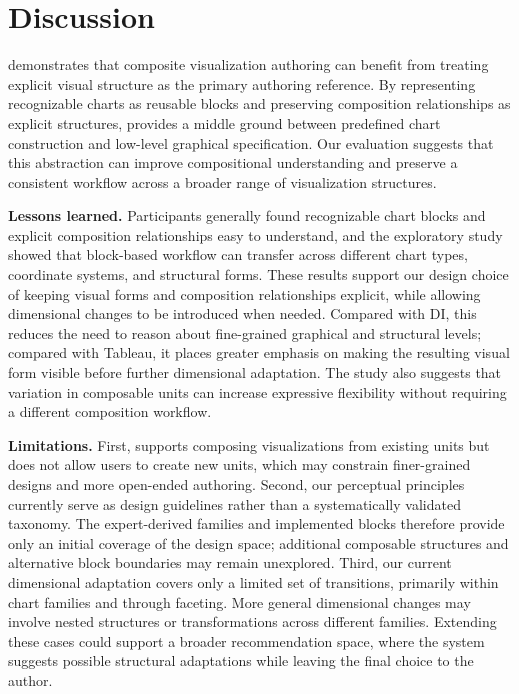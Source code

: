 \section{Discussion}
\label{sec:discussion}

{\system} demonstrates that composite visualization authoring can benefit from
treating explicit visual structure as the primary authoring reference. By
representing recognizable charts as reusable blocks and preserving composition
relationships as explicit structures, {\system} provides a middle ground
between predefined chart construction and low-level graphical specification.
Our evaluation suggests that this abstraction can improve compositional
understanding and preserve a consistent workflow across a broader range of
visualization structures.

\textbf{Lessons learned.}
Participants generally found recognizable chart blocks and explicit
composition relationships easy to understand, and the exploratory study showed
that block-based workflow can transfer across different chart
types, coordinate systems, and structural forms. These results support our
design choice of keeping visual forms and composition relationships explicit,
while allowing dimensional changes to be introduced when needed. Compared with
DI, this reduces the need to reason about fine-grained graphical and structural
levels; compared with Tableau, it places greater emphasis on making the
resulting visual form visible before further dimensional adaptation. The study
also suggests that variation in composable units can increase expressive
flexibility without requiring a different composition workflow.

\textbf{Limitations.} First, {\system} supports
composing visualizations from existing units but does not allow users to create
new units, which may constrain finer-grained designs and more open-ended
authoring. Second, our perceptual principles currently serve as design
guidelines rather than a systematically validated taxonomy. The expert-derived
families and implemented blocks therefore provide only an initial coverage of
the design space; additional composable structures and alternative block
boundaries may remain unexplored. 
Third, our current dimensional adaptation covers only a limited
set of transitions, primarily within chart families and through faceting.
More general dimensional changes may involve nested structures or transformations
across different families. Extending
these cases could support a broader recommendation space, where the system
suggests possible structural adaptations while leaving the final choice to the
author.



